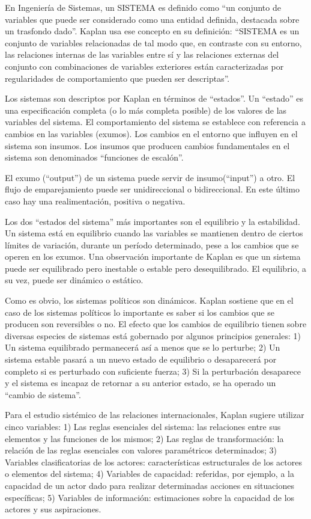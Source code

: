 \documentclass[
]{book}
\begin{document}
En Ingeniería de Sistemas, un SISTEMA es definido como ``un conjunto de variables que puede ser considerado como una entidad definida, destacada sobre un trasfondo dado''. Kaplan usa ese concepto en su definición: ``SISTEMA es un conjunto de variables relacionadas de tal modo que, en contraste con su entorno, las relaciones internas de las variables entre sí y las relaciones externas del conjunto con combinaciones de variables exteriores están caracterizadas por regularidades de comportamiento que pueden ser descriptas''.

Los sistemas son descriptos por Kaplan en términos de ``estados''. Un ``estado'' es una especificación completa (o lo más completa posible) de los valores de las variables del sistema. El comportamiento del sistema se establece con referencia a cambios en las variables (exumos). Los cambios en el entorno que influyen en el sistema son insumos. Los insumos que producen cambios fundamentales en el sistema son denominados ``funciones de escalón''.

El exumo (``output'') de un sistema puede servir de insumo(``input'') a otro. El flujo de emparejamiento puede ser unidireccional o bidireccional. En este último caso hay una realimentación, positiva o negativa.

Los dos ``estados del sistema'' más importantes son el equilibrio y la estabilidad. Un sistema está en equilibrio cuando las variables se mantienen dentro de ciertos límites de variación, durante un período determinado, pese a los cambios que se operen en los exumos. Una observación importante de Kaplan es que un sistema puede ser equilibrado pero inestable o estable pero desequilibrado. El equilibrio, a su vez, puede ser dinámico o estático.

Como es obvio, los sistemas políticos son dinámicos. Kaplan sostiene que en el caso de los sistemas políticos lo importante es saber si los cambios que se producen son reversibles o no. El efecto que los cambios de equilibrio tienen sobre diversas especies de sistemas está gobernado por algunos principios generales: 1) Un sistema equilibrado permanecerá así a menos que se lo perturbe; 2) Un sistema estable pasará a un nuevo estado de equilibrio o desaparecerá por completo si es perturbado con suficiente fuerza; 3) Si la perturbación desaparece y el sistema es incapaz de retornar a su anterior estado, se ha operado un ``cambio de sistema''.

Para el estudio sistémico de las relaciones internacionales, Kaplan sugiere utilizar cinco variables: 1) Las reglas esenciales del sistema: las relaciones entre sus elementos y las funciones de los mismos; 2) Las reglas de transformación: la relación de las reglas esenciales con valores paramétricos determinados; 3) Variables clasificatorias de los actores: características estructurales de los actores o elementos del sistema; 4) Variables de capacidad: referidas, por ejemplo, a la capacidad de un actor dado para realizar determinadas acciones en situaciones específicas; 5) Variables de información: estimaciones sobre la capacidad de los actores y sus aspiraciones.
\end{document}
